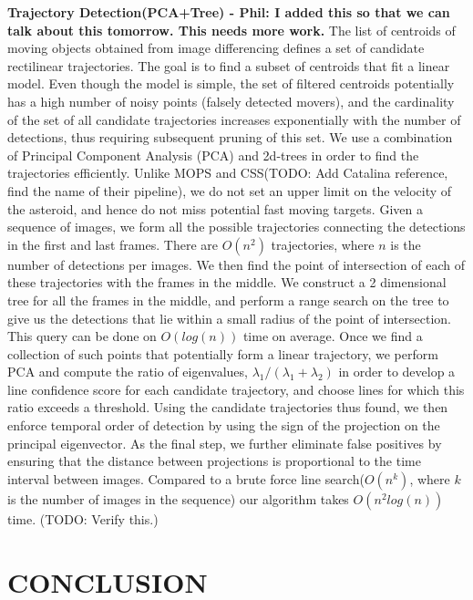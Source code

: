 \documentclass{article}
\begin{document}
{\bf Trajectory Detection(PCA+Tree) - Phil: I added this so that we can talk about this tomorrow. This needs more work.}
The list of centroids of moving objects obtained from image differencing defines a set of candidate rectilinear trajectories.  The goal is to find a subset of centroids that fit a linear model. Even though the model is simple, the set of filtered centroids potentially has a high number of noisy points (falsely detected movers), and the cardinality of the set of all candidate trajectories increases exponentially with the number of detections, thus requiring subsequent pruning of this set. We use a combination of Principal Component Analysis (PCA) and 2d-trees in order to find the trajectories efficiently. Unlike MOPS and CSS(TODO: Add Catalina reference, find the name of their pipeline), we do not set an upper limit on the velocity of the asteroid, and hence do not miss potential fast moving targets. Given a sequence of images, we form all the possible trajectories connecting the detections in the first and last frames. There are $O(n^2)$ trajectories, where $n$ is the number of detections per images. We then find the point of intersection of each of these trajectories with the frames in the middle. We construct a 2 dimensional tree for all the frames in the middle, and perform a range search on the tree to give us the detections that lie within a small radius of the point of intersection. This query can be done on $O(log(n))$ time on average. Once we find a collection of such points that potentially form a linear trajectory, we perform PCA and compute the ratio of eigenvalues, $\lambda_{1}/(\lambda_{1}+ \lambda_{2})$ in order to develop a line confidence score for each candidate trajectory, and choose lines for which this ratio exceeds a threshold. Using the candidate trajectories thus found, we then enforce temporal order of detection by using the sign of the projection on the principal eigenvector.  As the final step, we further eliminate false positives by ensuring that the distance between projections is proportional to the time interval between images. Compared to a brute force line search($O(n^k)$, where $k$ is the number of images in the sequence) our algorithm takes $O(n^2log(n))$ time. (TODO: Verify this.)




\section{CONCLUSION}
\end{document}
